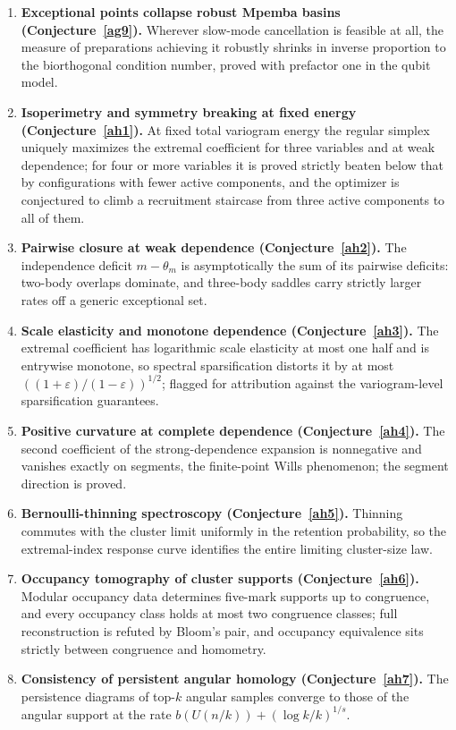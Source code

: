 \documentclass[11pt]{article}
\theoremstyle{definition}
\newcommand{\eps}{\varepsilon}
\begin{document}
\begin{enumerate}
\item \textbf{Exceptional points collapse robust Mpemba basins (Conjecture~\ref{ag9}).}  Wherever slow-mode cancellation is feasible at all, the measure of preparations achieving it robustly shrinks in inverse proportion to the biorthogonal condition number, proved with prefactor one in the qubit model.
\item \textbf{Isoperimetry and symmetry breaking at fixed energy (Conjecture~\ref{ah1}).}  At fixed total variogram energy the regular simplex uniquely maximizes the extremal coefficient for three variables and at weak dependence; for four or more variables it is proved strictly beaten below that by configurations with fewer active components, and the optimizer is conjectured to climb a recruitment staircase from three active components to all of them.
\item \textbf{Pairwise closure at weak dependence (Conjecture~\ref{ah2}).}  The independence deficit $m-\theta_m$ is asymptotically the sum of its pairwise deficits: two-body overlaps dominate, and three-body saddles carry strictly larger rates off a generic exceptional set.
\item \textbf{Scale elasticity and monotone dependence (Conjecture~\ref{ah3}).}  The extremal coefficient has logarithmic scale elasticity at most one half and is entrywise monotone, so spectral sparsification distorts it by at most $((1+\eps)/(1-\eps))^{1/2}$; flagged for attribution against the variogram-level sparsification guarantees.
\item \textbf{Positive curvature at complete dependence (Conjecture~\ref{ah4}).}  The second coefficient of the strong-dependence expansion is nonnegative and vanishes exactly on segments, the finite-point Wills phenomenon; the segment direction is proved.
\item \textbf{Bernoulli-thinning spectroscopy (Conjecture~\ref{ah5}).}  Thinning commutes with the cluster limit uniformly in the retention probability, so the extremal-index response curve identifies the entire limiting cluster-size law.
\item \textbf{Occupancy tomography of cluster supports (Conjecture~\ref{ah6}).}  Modular occupancy data determines five-mark supports up to congruence, and every occupancy class holds at most two congruence classes; full reconstruction is refuted by Bloom's pair, and occupancy equivalence sits strictly between congruence and homometry.
\item \textbf{Consistency of persistent angular homology (Conjecture~\ref{ah7}).}  The persistence diagrams of top-$k$ angular samples converge to those of the angular support at the rate $b(U(n/k))+(\log k/k)^{1/s}$.

\end{enumerate}
\end{document}
